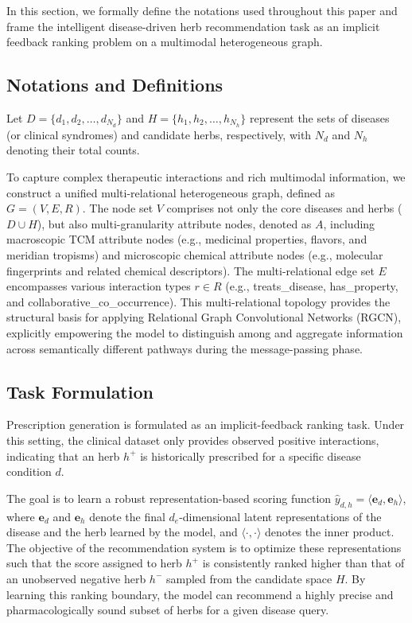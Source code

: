 \documentclass[a4paper,fleqn]{cas-dc}
\begin{document}
In this section, we formally define the notations used throughout this paper and frame the intelligent disease-driven herb recommendation task as an implicit feedback ranking problem on a multimodal heterogeneous graph.

\subsection{Notations and Definitions}

Let $D = \{d_1, \allowbreak d_2, \allowbreak \dots, \allowbreak d_{N_d}\}$ and $H = \{h_1, \allowbreak h_2, \allowbreak \dots, \allowbreak h_{N_h}\}$ represent the sets of diseases (or clinical syndromes) and candidate herbs, respectively, with $N_d$ and $N_h$ denoting their total counts. 

To capture complex therapeutic interactions and rich multimodal information, we construct a unified multi-\hspace{0pt}relational heterogeneous graph, defined as $G = (V, \allowbreak E, \allowbreak R)$. The node set $V$ comprises not only the core diseases and herbs ($D \cup H$), but also multi-\hspace{0pt}granularity attribute nodes, denoted as $A$, including macroscopic TCM attribute nodes (e.g., medicinal properties, flavors, and meridian tropisms) and microscopic chemical attribute nodes (e.g., molecular fingerprints and related chemical descriptors). The multi-\hspace{0pt}relational edge set $E$ encompasses various interaction types $r \in R$ (e.g., treats\_disease, \allowbreak has\_property, \allowbreak and collaborative\_co\_occurrence). This multi-relational topology provides the structural basis for applying Relational Graph Convolutional Networks (RGCN), explicitly empowering the model to distinguish among and aggregate information across semantically different pathways during the message-passing phase.

\subsection{Task Formulation}

Prescription generation is formulated as an implicit-feedback ranking task. Under this setting, the clinical dataset only provides observed positive interactions, indicating that an herb $h^+$ is historically prescribed for a specific disease condition $d$.

The goal is to learn a robust representation-based scoring function $\hat{y}_{d,h} = \langle \mathbf{e}_d, \mathbf{e}_h \rangle$, where $\mathbf{e}_d$ and $\mathbf{e}_h$ denote the final $d_e$-dimensional latent representations of the disease and the herb learned by the model, and $\langle \cdot, \cdot \rangle$ denotes the inner product. The objective of the recommendation system is to optimize these representations such that the score assigned to herb $h^+$ is consistently ranked higher than that of an unobserved negative herb $h^-$ sampled from the candidate space $H$. By learning this ranking boundary, the model can recommend a highly precise and pharmacologically sound subset of herbs for a given disease query.
\end{document}
